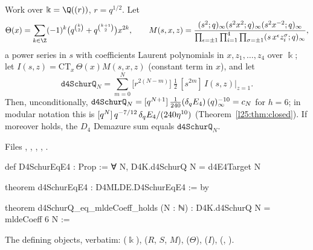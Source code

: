 \begin{theorem}[$D_4$: the series \lean{d4SchurQ} $=$ MLDE solution; Demazure $=$ \lean{d4SchurQ} under positivity]\label{l25:thm:d4}
Work over $\Bbbk=\Q((r))$, $r=q^{1/2}$. Let
\begin{equation*}
\Theta(x)=\sum_{k\in\Z}(-1)^k\big(q^{\binom k2}+q^{\binom{k+1}2}\big)x^{2k},\qquad
M(s,x,z)=\frac{(s^2;q)_\infty(s^2x^2;q)_\infty(s^2x^{-2};q)_\infty}
{\prod_{\epsilon=\pm1}\prod_{i=1}^4\prod_{\sigma=\pm1}(s\,x^\epsilon z_i^\sigma;q)_\infty},
\end{equation*}
a power series in $s$ with coefficients Laurent polynomials in $x,z_1,\dots,z_4$ over $\Bbbk$; let
$I(s,z)=\mathrm{CT}_x\,\Theta(x)M(s,x,z)$ (constant term in $x$), and let
\begin{equation*}
\mathtt{d4SchurQ}_N=\sum_{m=0}^{N}\Big[r^{2(N-m)}\Big]\ \tfrac12\,[s^{2m}]\,I(s,z)\big|_{z=1}.
\end{equation*}
Then, unconditionally, $\mathtt{d4SchurQ}_N=[q^{N+1}]\,\frac1{240}(\delta_q E_4)\,(q)_\infty^{-10}=c_N$ for $h=6$; in
modular notation this is $[q^N]\,q^{-7/12}\,\delta_q E_4/(240\eta^{10})$ (Theorem~\ref{l25:thm:closed}). If moreover
 holds, the $D_4$ Demazure sum equals $\mathtt{d4SchurQ}_N$.
\end{theorem}
\noindent Files ,
, , ,
.
\begin{leancode}
def D4SchurEqE4 : Prop := ∀ N, D4K.d4SchurQ N = d4E4Target N

theorem d4SchurEqE4 : D4MLDE.D4SchurEqE4 := by

theorem d4SchurQ_eq_mldeCoeff_holds (N : ℕ) : D4K.d4SchurQ N = mldeCoeff 6 N :=
\end{leancode}
\noindent The defining objects, verbatim: 
($\Bbbk$),  ($R$, $S$, $M$), 
($\Theta$),  ($I$),  (,
).
